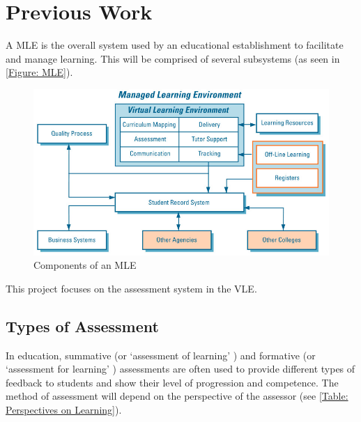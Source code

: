 \newif\ifnote
\notefalse

\chapter{Previous Work} 
\label{Chapter:Previous Work}

A \gls{MLE} is the overall system used by an educational establishment to facilitate and manage learning. This will be comprised of several subsystems (as seen in \autoref{Figure: MLE}).

\begin{figure}[h]
	\centering 
		\includegraphics[scale=0.4]{../figures/MLE.png} 		
	\caption{\label{Figure: MLE} Components of an \gls{MLE} \citep{mle}} 	
\end{figure}

This project focuses on the assessment system in the \gls{VLE}.

\section{Types of Assessment}
\label{Section: Types of Assessment}

In education, summative (or `assessment of learning' \citep{digiassess}) and formative (or `assessment for learning' \citep{digiassess}) assessments are often used to provide different types of feedback to students and show their level of progression and competence. The method of assessment will depend on the perspective of the assessor (see \autoref{Table: Perspectives on Learning}).


